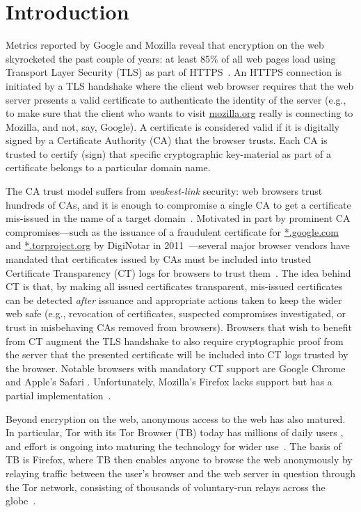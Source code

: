 \section{Introduction} \label{sec:introduction}
Metrics reported by Google and Mozilla reveal that encryption on the web
skyrocketed the past couple of years: at least 85\% of all web pages load using
Transport Layer Security (TLS) as part of
HTTPS~\cite{google-metrics,mozilla-metrics}. An HTTPS connection is initiated by
a TLS handshake where the client web browser requires that the web server
presents a valid certificate to authenticate the identity of the server (e.g.,
to make sure that the client who wants to visit \url{mozilla.org} really is
connecting to Mozilla, and not, say, Google). A certificate is considered valid
if it is digitally signed by a Certificate Authority (CA) that the browser
trusts. Each CA is trusted to certify (sign) that specific cryptographic
key-material as part of a certificate belongs to a particular domain name.

The CA trust model suffers from \emph{weakest-link} security: web browsers trust
hundreds of CAs, and it is enough to compromise a single CA to get a certificate
mis-issued in the name of a target domain~\cite{ca-ecosystem,https-sok}.
Motivated in part by prominent CA compromises---such as the issuance of a
fraudulent certificate for \url{*.google.com} and \url{*.torproject.org} by
DigiNotar in 2011~\cite{diginotar}---several major browser vendors have mandated
that certificates issued by CAs must be included into trusted Certificate
Transparency (CT) logs for browsers to trust them~\cite{ct/a,ct,ct/bis}. The
idea behind CT is that, by making all issued certificates transparent,
mis-issued certificates can be detected \emph{after} issuance and appropriate
actions taken to keep the wider web safe (e.g., revocation of certificates,
suspected compromises investigated, or trust in misbehaving CAs removed from
browsers). Browsers that wish to benefit from CT augment the TLS handshake to
also require cryptographic proof from the server that the presented certificate
will be included into CT logs trusted by the browser. Notable browsers with
mandatory CT support are Google Chrome and Apple's Safari
\cite{chrome-policy,safari-policy}. Unfortunately, Mozilla's Firefox lacks
support but has a partial implementation~\cite{ffct}.

Beyond encryption on the web, anonymous access to the web has also matured. In
particular, Tor with its Tor Browser (TB) today has millions of daily users
\cite{tor,mani}, and effort is ongoing into maturing the technology for wider
use~\cite{fftor}. The basis of TB is Firefox, where TB then enables anyone to
browse the web anonymously by relaying traffic between the user's browser and
the web server in question through the Tor network, consisting of thousands of
voluntary-run relays across the globe~\cite{relay-by-flag}. 

